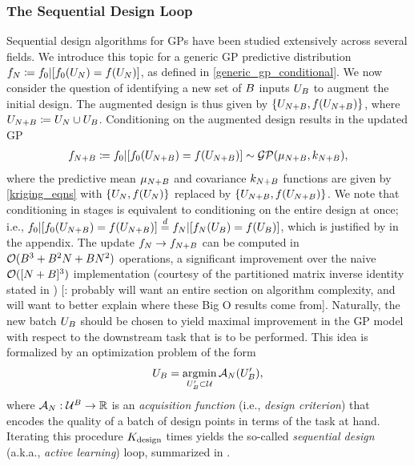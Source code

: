 \documentclass[12pt]{article}
\begin{document}
\subsubsection{The Sequential Design Loop}
Sequential design algorithms for GPs have been studied extensively across several fields. We introduce this topic 
for a generic GP predictive distribution $\funcEm[\Ndesign] \Def \funcPrior|[\funcPrior(\designIn) = \func(\designIn)]$, as defined in 
\ref{generic_gp_conditional}. We now consider the question of identifying a new set of $\Nbatch$
inputs $\designBatchIn$ to augment the initial design. The augmented design is thus given by 
$\{\designIn[\Naugment], \func(\designIn[\Naugment])\}$, where 
$\designIn[\Naugment] \Def \designIn[\Ndesign] \cup \designBatchIn$. 
Conditioning on the augmented design results in the updated GP
\begin{align}
\funcEm[\Naugment] \Def \funcPrior|[\funcPrior(\designIn[\Naugment]) = \func(\designIn[\Naugment])] \sim \GP(\gpMean[\Naugment], \gpKer[\Naugment]),
\end{align}
where the predictive mean $\gpMean[\Naugment]$ and covariance $\gpKer[\Naugment]$ functions are given by \ref{kriging_eqns}
with $\{\designIn, \func(\designIn)\}$ replaced by $\{\designIn[\Naugment], \func(\designIn[\Naugment])\}$. 
We note that conditioning in stages is equivalent to conditioning on the entire design at once; i.e.,
$\funcPrior|[\funcPrior(\designIn[\Naugment]) = \func(\designIn[\Naugment])] \eqDist 
\funcEm[\Ndesign]|[\funcEm[\Ndesign](\designIn[\Nbatch]) = \func(\designBatchIn)]$, which is justified 
by  in the appendix. 
The update $\funcEm[\Ndesign] \to \funcEm[\Naugment]$ 
can be computed in $\BigO(\Nbatch^3 + \Nbatch^2 \Ndesign + \Nbatch \Ndesign^2)$ operations, 
a significant improvement over the naive $\BigO([\Ndesign + \Nbatch]^3)$
implementation (courtesy of the partitioned matrix inverse identity stated in )
[\todo: probably will want an entire section on algorithm complexity, and will want to better explain where 
these Big O results come from]. 
Naturally, the new batch $\designBatchIn$ should be chosen to 
yield maximal improvement in the GP model with respect to the downstream task that is to be performed. 
This idea is formalized by an optimization problem of the form 
\begin{align}
\designBatchIn = \argmin_{\designBatchIn^\prime \subset \parSpace} \acq[\Ndesign](\designBatchIn^\prime), \label{acq_func_opt}
\end{align}
where $\acq[\Ndesign]: \parSpace^{\Nbatch} \to \R$ is an \textit{acquisition function} (i.e., \textit{design criterion}) that 
encodes the quality of a batch of design points in terms of the task at hand. Iterating this procedure $\Nrounds$ times yields the so-called 
\textit{sequential design} (a.k.a., \textit{active learning}) loop, summarized in .  
\end{document}
